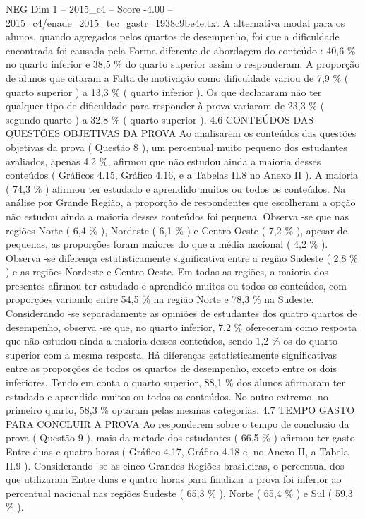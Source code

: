 \begin{textsample}{NEG Dim 1 – 2015\_c4 – Score -4.00 – 2015\_c4/enade\_2015\_tec\_gastr\_1938c9be4e.txt}
A alternativa modal para os alunos, quando agregados pelos quartos de desempenho, foi que a dificuldade encontrada foi causada pela Forma diferente de abordagem do conteúdo : 40,6 \% no quarto inferior e 38,5 \% do quarto superior assim o responderam.
A proporção de alunos que citaram a Falta de motivação como dificuldade variou de 7,9 \% ( quarto superior ) a 13,3 \% ( quarto inferior ).
Os que declararam não ter qualquer tipo de dificuldade para responder à prova variaram de 23,3 \% ( segundo quarto ) a 32,8 \% ( quarto superior ). 4.6 CONTEÚDOS DAS QUESTÕES OBJETIVAS DA PROVA Ao analisarem os conteúdos das questões objetivas da prova ( Questão 8 ), um percentual muito pequeno dos estudantes avaliados, apenas 4,2 \%, afirmou que não estudou ainda a maioria desses conteúdos ( Gráficos 4.15, Gráfico 4.16, e a Tabelas II.8 no Anexo II ).
A maioria ( 74,3 \% ) afirmou ter estudado e aprendido muitos ou todos os conteúdos.
Na análise por Grande Região, a proporção de respondentes que escolheram a opção não estudou ainda a maioria desses conteúdos foi pequena.
Observa -se que nas regiões Norte ( 6,4 \% ), Nordeste ( 6,1 \% ) e Centro-Oeste ( 7,2 \% ), apesar de pequenas, as proporções foram maiores do que a média nacional ( 4,2 \% ).
Observa -se diferença estatisticamente significativa entre a região Sudeste ( 2,8 \% ) e as regiões Nordeste e Centro-Oeste.
Em todas as regiões, a maioria dos presentes afirmou ter estudado e aprendido muitos ou todos os conteúdos, com proporções variando entre 54,5 \% na região Norte e 78,3 \% na Sudeste.
Considerando -se separadamente as opiniões de estudantes dos quatro quartos de desempenho, observa -se que, no quarto inferior, 7,2 \% ofereceram como resposta que não estudou ainda a maioria desses conteúdos, sendo 1,2 \% os do quarto superior com a mesma resposta.
Há diferenças estatisticamente significativas entre as proporções de todos os quartos de desempenho, exceto entre os dois inferiores.
Tendo em conta o quarto superior, 88,1 \% dos alunos afirmaram ter estudado e aprendido muitos ou todos os conteúdos.
No outro extremo, no primeiro quarto, 58,3 \% optaram pelas mesmas categorias. 4.7 TEMPO GASTO PARA CONCLUIR A PROVA Ao responderem sobre o tempo de conclusão da prova ( Questão 9 ), mais da metade dos estudantes ( 66,5 \% ) afirmou ter gasto Entre duas e quatro horas ( Gráfico 4.17, Gráfico 4.18 e, no Anexo II, a Tabela II.9 ).
Considerando -se as cinco Grandes Regiões brasileiras, o percentual dos que utilizaram Entre duas e quatro horas para finalizar a prova foi inferior ao percentual nacional nas regiões Sudeste ( 65,3 \% ), Norte ( 65,4 \% ) e Sul ( 59,3 \% ).

\end{textsample}
